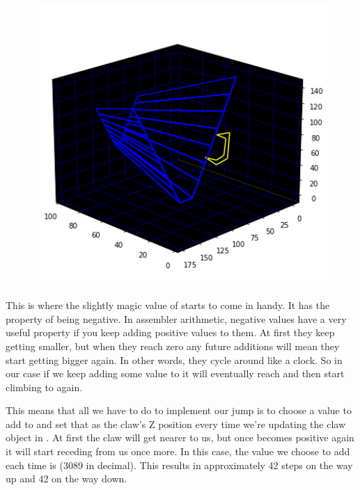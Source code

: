 \begin{minipage}[c]{0.31\linewidth}
\begin{figure}[H]
    \centering
    \begin{adjustbox}{width=5.5cm,center}
      \includegraphics[width=12cm]{src/jump/web_29.png}%
    \end{adjustbox}
\end{figure}
\end{minipage}

This is where the slightly magic value of  starts to come in handy. It has the
property of being negative. In assembler arithmetic, negative values have a very useful property
if you keep adding positive values to them. At first they keep getting smaller, but when they reach
zero any future additions will mean they start getting bigger again. In other words, they cycle
around like a clock. So in our case if we keep adding some value to  it will eventually
reach  and then start climbing to  again. 

This means that all we have to do to implement our jump is to choose a value to add to  and
set that as the claw's Z position every time we're updating the claw object in . At first
the claw will get nearer to us, but once  becomes positive again it will start receding from us 
once more. In this case, the value we choose to add each time is  (3089 in decimal). This results
in approximately 42 steps on the way up and 42 on the way down.

